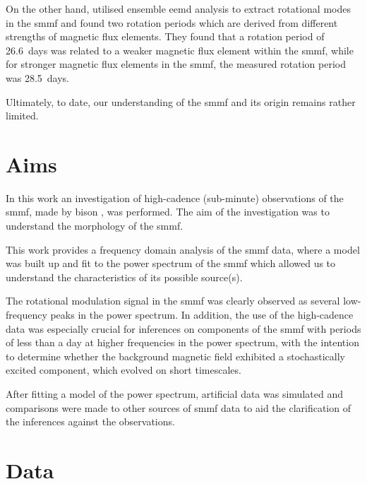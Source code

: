 On the other hand, \citet{xiang_ensemble_2016} utilised ensemble \gls{eemd} analysis to extract rotational modes in the \gls{smmf} and found two rotation periods which are derived from different strengths of magnetic flux elements. They found that a rotation period of 26.6~days was related to a weaker magnetic flux element within the \gls{smmf}, while for stronger magnetic flux elements in the \gls{smmf}, the measured rotation period was 28.5~days.

Ultimately, to date, our understanding of the \gls{smmf} and its origin remains rather limited.


\section{Aims}\label{sec:SMMF_aims}

In this work an investigation of high-cadence (sub-minute) observations of the \gls{smmf}, made by \gls{bison} \citep{chaplin_bison_1996, chaplin_noise_2005, hale_performance_2016}, was performed. The aim of the investigation was to understand the morphology of the \gls{smmf}. 

This work provides a frequency domain analysis of the \gls{smmf} data, where a model was built up and fit to the power spectrum of the \gls{smmf} which allowed us to understand the characteristics of its possible source(s). 

The rotational modulation signal in the \gls{smmf} was clearly observed as several low-frequency peaks in the power spectrum. In addition, the use of the high-cadence data was especially crucial for inferences on components of the \gls{smmf} with periods of less than a day at higher frequencies in the power spectrum, with the intention to determine whether the background magnetic field exhibited a stochastically excited component, which evolved on short timescales.

After fitting a model of the power spectrum, artificial data was simulated and comparisons were made to other sources of \gls{smmf} data to aid the clarification of the inferences against the observations.



\section{Data}\label{sec:SMMF_data}


